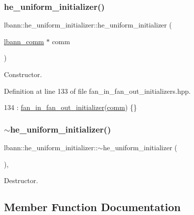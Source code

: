 \subsubsection{\texorpdfstring{he\+\_\+uniform\+\_\+initializer()}{he\_uniform\_initializer()}}
{\footnotesize\ttfamily lbann\+::he\+\_\+uniform\+\_\+initializer\+::he\+\_\+uniform\+\_\+initializer (\begin{DoxyParamCaption}\item[{\hyperlink{classlbann_1_1lbann__comm}{lbann\+\_\+comm} $\ast$}]{comm }\end{DoxyParamCaption})\hspace{0.3cm}{\ttfamily [inline]}}

Constructor. 

Definition at line 133 of file fan\+\_\+in\+\_\+fan\+\_\+out\+\_\+initializers.\+hpp.


\begin{DoxyCode}
134     : \hyperlink{classlbann_1_1fan__in__fan__out__initializer_a3a3811af11b1a70a57af846ae2cdf668}{fan\_in\_fan\_out\_initializer}(\hyperlink{file__io_8cpp_ab048c6f9fcbcfaa57ce68b00263dbebe}{comm}) \{\}
\end{DoxyCode}
\mbox{\label{classlbann_1_1he__uniform__initializer_a04aa97a63397eec43eba03f377704af3}} 
\subsubsection{\texorpdfstring{$\sim$he\+\_\+uniform\+\_\+initializer()}{~he\_uniform\_initializer()}}
{\footnotesize\ttfamily lbann\+::he\+\_\+uniform\+\_\+initializer\+::$\sim$he\+\_\+uniform\+\_\+initializer (\begin{DoxyParamCaption}{ }\end{DoxyParamCaption})\hspace{0.3cm}{\ttfamily [override]}, {\ttfamily [default]}}

Destructor. 

\subsection{Member Function Documentation}
\mbox{\label{classlbann_1_1he__uniform__initializer_a9860575b43f3d08831d00219bb07ec73}} 
